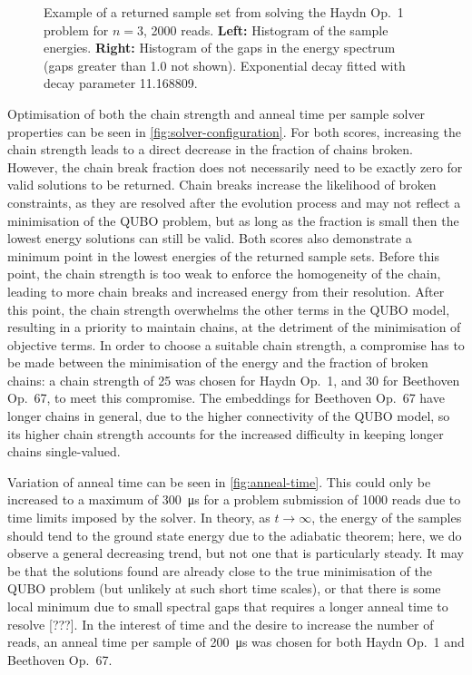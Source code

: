 \documentclass[12pt]{article}
\theoremstyle{definition}
\begin{document}
\begin{figure}[h]
    \centering\footnotesize
    
    \caption{Example of a returned sample set from solving the Haydn Op.\ 1 problem for $n=3$, \num{2000} reads. \textbf{Left:} Histogram of the sample energies. \textbf{Right:} Histogram of the gaps in the energy spectrum (gaps greater than \num{1.0} not shown). Exponential decay fitted with decay parameter \num{11.168809}.}
    \label{fig:histograms}
\end{figure}

Optimisation of both the chain strength and anneal time per sample solver properties can be seen in \cref{fig:solver-configuration}. For both scores, increasing the chain strength leads to a direct decrease in the fraction of chains broken. However, the chain break fraction does not necessarily need to be exactly zero for valid solutions to be returned. Chain breaks increase the likelihood of broken constraints, as they are resolved after the evolution process and may not reflect a minimisation of the QUBO problem, but as long as the fraction is small then the lowest energy solutions can still be valid. Both scores also demonstrate a minimum point in the lowest energies of the returned sample sets. Before this point, the chain strength is too weak to enforce the homogeneity of the chain, leading to more chain breaks and increased energy from their resolution. After this point, the chain strength overwhelms the other terms in the QUBO model, resulting in a priority to maintain chains, at the detriment of the minimisation of objective terms. In order to choose a suitable chain strength, a compromise has to be made between the minimisation of the energy and the fraction of broken chains: a chain strength of \num{25} was chosen for Haydn Op.\ 1, and \num{30} for Beethoven Op.\ 67, to meet this compromise. The embeddings for Beethoven Op.\ 67 have longer chains in general, due to the higher connectivity of the QUBO model, so its higher chain strength accounts for the increased difficulty in keeping longer chains single-valued.

Variation of anneal time can be seen in \cref{fig:anneal-time}. This could only be increased to a maximum of \qty{300}{\us} for a problem submission of \num{1000} reads due to time limits imposed by the solver. In theory, as $t\to\infty$, the energy of the samples should tend to the ground state energy due to the adiabatic theorem; here, we do observe a general decreasing trend, but not one that is particularly steady. It may be that the solutions found are already close to the true minimisation of the QUBO problem (but unlikely at such short time scales), or that there is some local minimum due to small spectral gaps that requires a longer anneal time to resolve [???]. In the interest of time and the desire to increase the number of reads, an anneal time per sample of \qty{200}{\us} was chosen for both Haydn Op.\ 1 and Beethoven Op.\ 67.
\end{document}
